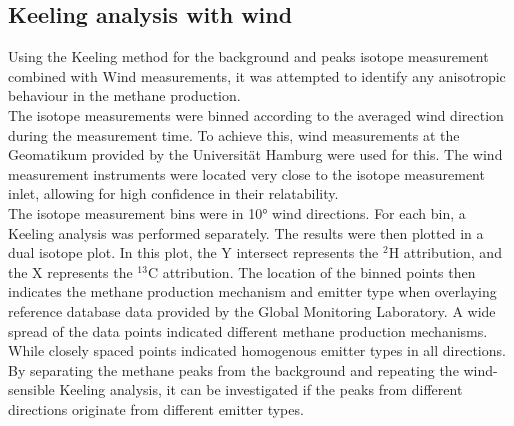 \subsection{Keeling analysis with wind}
Using the Keeling method for the background and peaks isotope measurement combined with Wind measurements, it was attempted to identify any anisotropic behaviour in the methane production.\\
The isotope measurements were binned according to the averaged wind direction during the measurement time. To achieve this, wind measurements at the Geomatikum provided by the Universität Hamburg were used for this. The wind measurement instruments were located very close to the isotope measurement inlet, allowing for high confidence in their relatability.\\
The isotope measurement bins were in 10° wind directions. For each bin, a Keeling analysis was performed separately. The results were then plotted in a dual isotope plot. In this plot, the Y intersect represents the $^2$H attribution, and the X represents the $^{13}$C attribution. The location of the binned points then indicates the methane production mechanism and emitter type when overlaying reference database data \cite{OwenA.Sherwood.2020} provided by the Global Monitoring Laboratory. A wide spread of the data points indicated different methane production mechanisms. While closely spaced points indicated homogenous emitter types in all directions.\\
By separating the methane peaks from the background and repeating the wind-sensible Keeling analysis, it can be investigated if the peaks from different directions originate from different emitter types.

